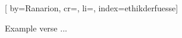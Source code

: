 
[%
    by={Ranarion},
    cr={},
    li={},
    index={ethikderfuesse}]


    \label{ethikderfuesse}

    \beginverse
        Example verse ...
    \endverse
\endsong

